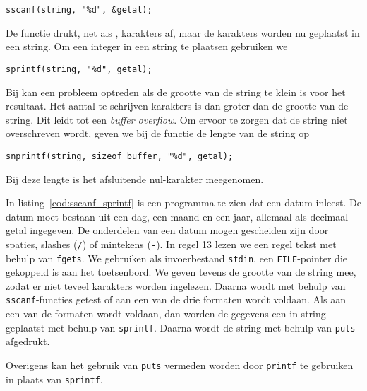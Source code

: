 \begin{lstlisting}[style=lstoneline]
sscanf(string, "%d", &getal);
\end{lstlisting}

De functie  drukt, net als , karakters af, maar de karakters worden nu geplaatst in een string. Om een integer in een string te plaatsen gebruiken we

\begin{lstlisting}[style=lstoneline]
sprintf(string, "%d", getal);
\end{lstlisting}

Bij  kan een probleem optreden als de grootte van de string te klein is voor het resultaat. Het aantal te schrijven karakters is dan groter dan de grootte van de string. Dit leidt tot een \textsl{buffer overflow}. Om ervoor te zorgen dat de string niet overschreven wordt, geven we bij de functie  de lengte van de string op

\begin{lstlisting}[style=lstoneline]
snprintf(string, sizeof buffer, "%d", getal);
\end{lstlisting}

Bij deze lengte is het afsluitende nul-karakter meegenomen.

In listing~\ref{cod:sscanf_sprintf} is een programma te zien dat een datum inleest. De datum moet bestaan uit een dag, een maand en een jaar, allemaal als decimaal getal ingegeven. De onderdelen van een datum mogen gescheiden zijn door spaties, slashes (\texttt{/}) of mintekens (\texttt{-}). In regel 13 lezen we een regel tekst met behulp van \texttt{fgets}. We gebruiken als invoerbestand \texttt{stdin}, een \texttt{FILE}-pointer die gekoppeld is aan het toetsenbord. We geven tevens de grootte van de string mee, zodat er niet teveel karakters worden ingelezen. Daarna wordt met behulp van \texttt{sscanf}-functies getest of aan een van de drie formaten wordt voldaan. Als aan een van de formaten wordt voldaan, dan worden de gegevens een in string geplaatst met behulp van \texttt{sprintf}. Daarna wordt de string met behulp van \texttt{puts} afgedrukt.


Overigens kan het gebruik van \texttt{puts} vermeden worden door \texttt{printf} te gebruiken in plaats van \texttt{sprintf}. \iffalse\ifuseadvanced We zullen in paragraaf~\ref{sec:invoeruitvoermcu} laten zien waarom \texttt{sprintf} nodig is.\fi\fi


